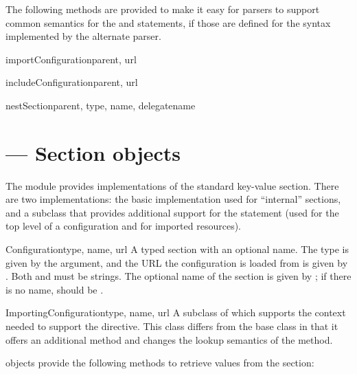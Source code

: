 \documentclass{howto}
\begin{document}
The following methods are provided to make it easy for parsers to
support common semantics for the  and
 statements, if those are defined for the syntax
implemented by the alternate parser.

\begin{methoddesc}{importConfiguration}{parent, url}
\end{methoddesc}

\begin{methoddesc}{includeConfiguration}{parent, url}
\end{methoddesc}

\begin{methoddesc}{nestSection}{parent, type, name, delegatename}
\end{methoddesc}


\section{ --- Section objects}



The  module provides implementations of the
standard key-value section.  There are two implementations: the basic
implementation used for ``internal'' sections, and a subclass that
provides additional support for the  statement (used
for the top level of a configuration and for imported resources).

\begin{classdesc}{Configuration}{type, name, url}
  A typed section with an optional name.  The type is given by the
   argument, and the URL the configuration is loaded from is
  given by .  Both  and  must be strings.
  The optional name of the section is given by ; if there is
  no name,  should be .
\end{classdesc}

\begin{classdesc}{ImportingConfiguration}{type, name, url}
  A subclass of  which supports the context
  needed to support the  directive.  This class
  differs from the base class in that it offers an additional method
  and changes the lookup semantics of the  method.
\end{classdesc}

 objects provide the following methods to
retrieve values from the section:
\end{document}
